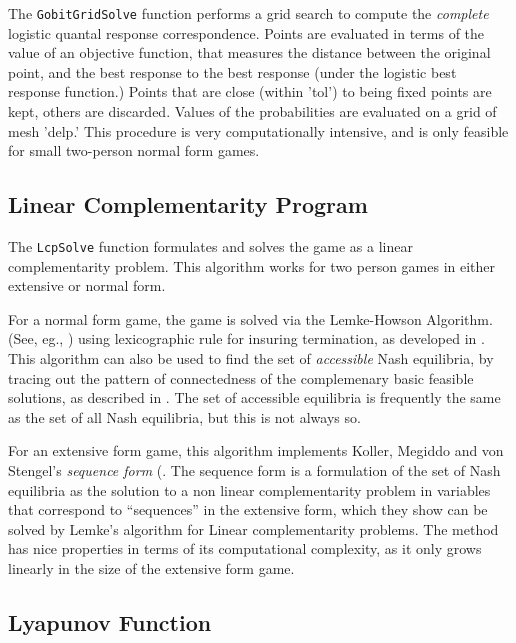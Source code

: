 The {\tt GobitGridSolve} function performs a grid search to compute
the {\em complete} logistic quantal response correspondence.  Points
are evaluated in terms of the value of an objective function, that
measures the distance between the original point, and the best
response to the best response (under the logistic best response
function.)  Points that are close (within 'tol') to being fixed points
are kept, others are discarded.  Values of the probabilities are
evaluated on a grid of mesh 'delp.'  This procedure is very
computationally intensive, and is only feasible for small two-person
normal form games.

\subsection{Linear Complementarity Program}

The {\tt LcpSolve} function formulates and solves the game as a linear
complementarity problem.  This algorithm works for two person
games in either extensive or normal form.  
 
For a normal form game, the game is solved via the Lemke-Howson
Algorithm.  (See, eg.,
\cite{LemHow:64}) using lexicographic rule for insuring
termination, as developed in \cite{Eav:71}.  This algorithm can also
be used to find the set of {\em accessible} Nash equilibria, by
tracing out the pattern of connectedness of the complemenary basic
feasible solutions, as described in \cite{Sha:74}.  The set of
accessible equilibria is frequently the same as the set of all Nash
equilibria, but this is not always so.

For an extensive form game, this algorithm implements Koller, Megiddo
and von Stengel's {\em sequence form} (\cite{KolMegSte:94}. The
sequence form is a formulation of the set of Nash equilibria as the
solution to a non linear complementarity problem in variables that
correspond to ``sequences'' in the extensive form, which they show can
be solved by Lemke's algorithm for Linear complementarity problems.
The method has nice properties in terms of its computational
complexity, as it only grows linearly in the size of the extensive
form game.  

\subsection{Lyapunov Function}


